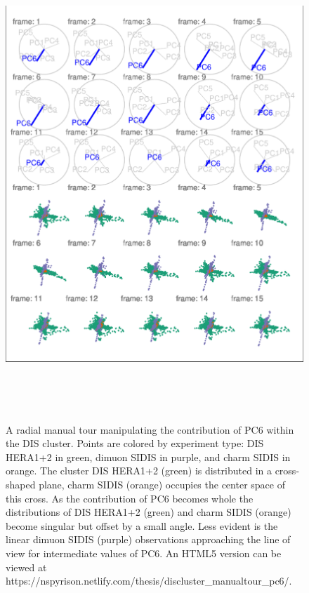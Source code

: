 \begin{Schunk}
\begin{figure}

{\centering \includegraphics[width=5.83in,height=7in]{spinifex_paper_files/figure-latex/DISclusterGood-1} 

}

\caption[A radial manual tour manipulating the contribution of PC6 within the DIS cluster]{A radial manual tour manipulating the contribution of PC6 within the DIS cluster. Points are colored by experiment type: DIS HERA1+2 in green, dimuon SIDIS in purple, and charm SIDIS in orange. The cluster DIS HERA1+2 (green) is distributed in a cross-shaped plane, charm SIDIS (orange) occupies the center space of this cross. As the contribution of PC6 becomes whole the distributions of DIS HERA1+2 (green) and charm SIDIS (orange) become singular but offset by a small angle. Less evident is the linear dimuon SIDIS (purple) observations approaching the line of view for intermediate values of PC6. An HTML5 version can be viewed at https://nspyrison.netlify.com/thesis/discluster\_manualtour\_pc6/.}\label{fig:DISclusterGood}
\end{figure}
\end{Schunk}

